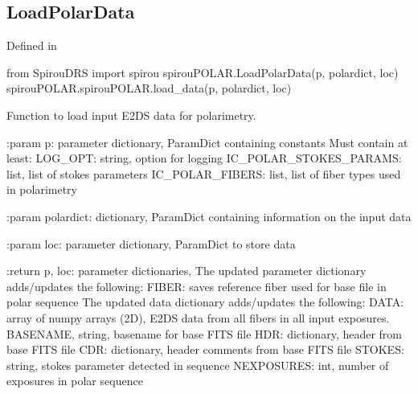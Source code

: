 \noindent\begin{minipage}{\textwidth}
\subsection{LoadPolarData}

Defined in \spirouPOLAR{}

\begin{pythonbox}
from SpirouDRS import spirou
spirouPOLAR.LoadPolarData(p, polardict, loc)
spirouPOLAR.spirouPOLAR.load_data(p, polardict, loc)
\end{pythonbox}

\begin{pythondocstring}
Function to load input E2DS data for polarimetry.
    
:param p: parameter dictionary, ParamDict containing constants
    Must contain at least:
        LOG_OPT: string, option for logging
        IC_POLAR_STOKES_PARAMS: list, list of stokes parameters
        IC_POLAR_FIBERS: list, list of fiber types used in polarimetry

:param polardict: dictionary, ParamDict containing information on the
                  input data
    
:param loc: parameter dictionary, ParamDict to store data
    
:return p, loc: parameter dictionaries,
    The updated parameter dictionary adds/updates the following:
        FIBER: saves reference fiber used for base file in polar sequence
               The updated data dictionary adds/updates the following:
        DATA: array of numpy arrays (2D), E2DS data from all fibers in
              all input exposures.
        BASENAME, string, basename for base FITS file
        HDR: dictionary, header from base FITS file
        CDR: dictionary, header comments from base FITS file
        STOKES: string, stokes parameter detected in sequence
        NEXPOSURES: int, number of exposures in polar sequence
\end{pythondocstring}
\end{minipage}



